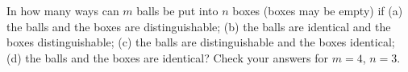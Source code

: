 In how many ways can $m$ balls be put into $n$ boxes (boxes may be empty) if
(a) the balls and the boxes are distinguishable;
(b) the balls are identical and the boxes distinguishable;
(c) the balls are distinguishable and the boxes identical;
(d) the balls and the boxes are identical?
Check your answers for $m=4$, $n=3$.

